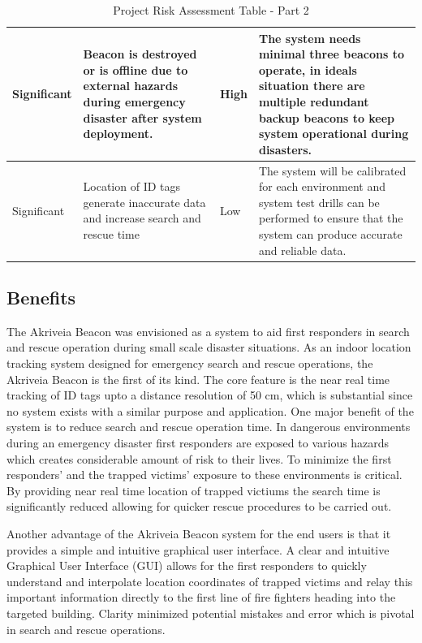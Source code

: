 \begin{table}[H]
\begin{tabular}{ | m{1.6cm} | m{4cm}| m{2cm} | m{7.4cm}|}
\hline
Significant & Beacon is destroyed or is offline due to external hazards during emergency disaster after system deployment. & High & The system needs minimal three beacons to operate, in ideals situation there are multiple redundant backup beacons to keep system operational during disasters. \\
\hline
Significant & Location of ID tags generate inaccurate data and increase  search and rescue time & Low & The system will be calibrated for each environment and system test drills can be performed to ensure that the system can produce accurate and reliable data. \\
\hline
\end{tabular}
\caption{Project Risk Assessment Table - Part 2}
\end{table}	


\pagebreak
\subsection{Benefits}
\medskip
The Akriveia Beacon was envisioned as a system to aid first responders in search and rescue operation during small scale disaster situations. As an indoor location tracking system designed for emergency search and rescue operations, the Akriveia Beacon is the first of its kind. The core feature is the near real time tracking of ID tags upto a distance resolution of 50 cm, which is substantial since no system exists with a similar purpose and application. One major benefit of the system is to reduce search and rescue operation time. In dangerous environments during an emergency disaster first responders are exposed to various hazards which creates considerable amount of risk to their lives. To minimize the first responders’ and the trapped victims' exposure to these environments is critical. By providing near real time location of trapped victiums the search time is significantly reduced allowing for quicker rescue procedures to be carried out.

\bigskip
Another advantage of the Akriveia Beacon system for the end users is that it provides a simple and intuitive graphical user interface. A clear and intuitive Graphical User Interface (\Gls{GUI}) allows for the first responders to quickly understand and interpolate location coordinates of trapped victims and relay this important information directly to the first line of fire fighters heading into the targeted building. Clarity minimized potential mistakes and error which is pivotal in search and rescue operations.

